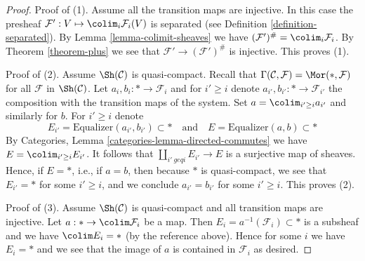 \begin{proof}
Proof of (1). Assume all the transition maps are injective.
In this case the presheaf
$\mathcal{F}' : V \mapsto \colim_i \mathcal{F}_i(V)$ is
separated (see Definition \ref{definition-separated}).
By Lemma \ref{lemma-colimit-sheaves}
we have
$(\mathcal{F}')^\# = \colim_i \mathcal{F}_i$.
By Theorem \ref{theorem-plus}
we see that $\mathcal{F}' \to (\mathcal{F}')^\#$ is injective.
This proves (1).

\medskip\noindent
Proof of (2). Assume $\Sh(\mathcal{C})$ is quasi-compact. Recall that
$\Gamma(\mathcal{C}, \mathcal{F}) = \Mor(*, \mathcal{F})$
for all $\mathcal{F}$ in $\Sh(\mathcal{C})$.
Let $a_i, b_i : * \to \mathcal{F}_i$ and for
$i' \geq i$ denote $a_{i'}, b_{i'} : * \to \mathcal{F}_{i'}$
the composition with the transition maps of the system.
Set $a = \colim_{i' \geq i} a_{i'}$ and similarly for $b$.
For $i' \geq i$ denote
$$
E_{i'} = \text{Equalizer}(a_{i'}, b_{i'}) \subset *
\quad\text{and}\quad
E = \text{Equalizer}(a, b) \subset *
$$
By Categories, Lemma \ref{categories-lemma-directed-commutes} we have
$E = \colim_{i' \geq i} E_{i'}$. It follows that
$\coprod_{i'\ geq i} E_{i'} \to E$
is a surjective map of sheaves. Hence, if $E = *$, i.e., if $a = b$,
then because $*$ is quasi-compact, we see that $E_{i'} = *$ for some
$i' \geq i$, and we conclude $a_{i'} = b_{i'}$ for some $i' \geq i$.
This proves (2).

\medskip\noindent
Proof of (3). Assume $\Sh(\mathcal{C})$ is quasi-compact and all
transition maps are injective. Let $a : * \to \colim \mathcal{F}_i$
be a map. Then $E_i = a^{-1}(\mathcal{F}_i) \subset *$ is a subsheaf
and we have $\colim E_i = *$ (by the reference above). Hence for
some $i$ we have $E_i = *$ and we see that the image of $a$ is
contained in $\mathcal{F}_i$ as desired.


\end{proof}
